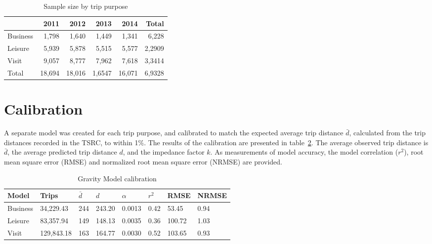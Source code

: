 \begin{table}[H]
\centering
\caption{Sample size by trip purpose}
\label{table:purpose-counts}
\begin{tabular}{lrrrrr}
\toprule
			& 2011 	& 2012 	& 2013 	& 2014 	& Total \\
\midrule
Business 	& 1,798  & 1,640  & 1,449  & 1,341  & 6,228 \\
Leisure 	& 5,939  & 5,878  & 5,515  & 5,577  & 2,2909 \\
Visit 		& 9,057  & 8,777  & 7,962  & 7,618  & 3,3414 \\ 
\midrule
Total 		& 18,694 & 18,016 & 1,6547 & 16,071 & 6,9328 \\ 
\bottomrule
\end{tabular}%

\end{table}

\section{Calibration}
A separate model was created for each trip purpose, and calibrated to match the expected average trip distance $\bar{d}$, calculated from the trip distances recorded in the TSRC, to within 1\%. The results of the calibration are presented in table~\ref{table:gravity-calibration}. The average observed trip distance is $\bar{d}$, the average predicted trip distance $d$, and the impedance factor $k$. As measurements of model accuracy, the model correlation ($r^2$), root mean square error (RMSE) and normalized root mean square error (NRMSE) are provided.

\begin{table}[H]
\centering
\caption{Gravity Model calibration}
\label{table:gravity-calibration}
\begin{tabular}{@{}lllll|lll@{}}
\toprule
Model & Trips & $\bar{d}$ & $d$ & $\alpha$ & $r^2$ & RMSE & NRMSE \\ \midrule
   Business  & 34,229.43  &     244     &  243.20   & 0.0013  & 0.42 & 53.45 & 0.94 \\
   Leisure   & 83,357.94  &     149     &  148.13   & 0.0035  & 0.36 & 100.72 & 1.03 \\
   Visit     & 129,843.18 &     163     &  164.77   & 0.0030 & 0.52 & 103.65 & 0.93 \\ \bottomrule
\end{tabular}
\end{table}

